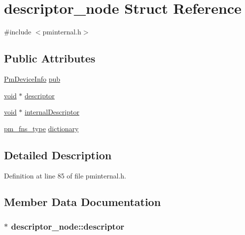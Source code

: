 \hypertarget{structdescriptor__node}{}\section{descriptor\+\_\+node Struct Reference}
\label{structdescriptor__node}


{\ttfamily \#include $<$pminternal.\+h$>$}

\subsection*{Public Attributes}
\begin{DoxyCompactItemize}
\item 
\hyperlink{struct_pm_device_info}{Pm\+Device\+Info} \hyperlink{structdescriptor__node_a63b20f87d756eab969d3352103322516}{pub}
\item 
\hyperlink{sound_8c_ae35f5844602719cf66324f4de2a658b3}{void} $\ast$ \hyperlink{structdescriptor__node_a6a355a03bd3961544ca836f2e3fe477a}{descriptor}
\item 
\hyperlink{sound_8c_ae35f5844602719cf66324f4de2a658b3}{void} $\ast$ \hyperlink{structdescriptor__node_a5e90cf08a561afbc02fa8ac72264bb9a}{internal\+Descriptor}
\item 
\hyperlink{pminternal_8h_a28b39bba2919ba7ccbe1bfa11443465b}{pm\+\_\+fns\+\_\+type} \hyperlink{structdescriptor__node_a79791dac344af440b10af2ab9cee26e3}{dictionary}
\end{DoxyCompactItemize}


\subsection{Detailed Description}


Definition at line 85 of file pminternal.\+h.



\subsection{Member Data Documentation}
\subsubsection[{\texorpdfstring{descriptor}{descriptor}}]{$\ast$ descriptor\+\_\+node\+::descriptor}\hypertarget{structdescriptor__node_a6a355a03bd3961544ca836f2e3fe477a}{}\label{structdescriptor__node_a6a355a03bd3961544ca836f2e3fe477a}


